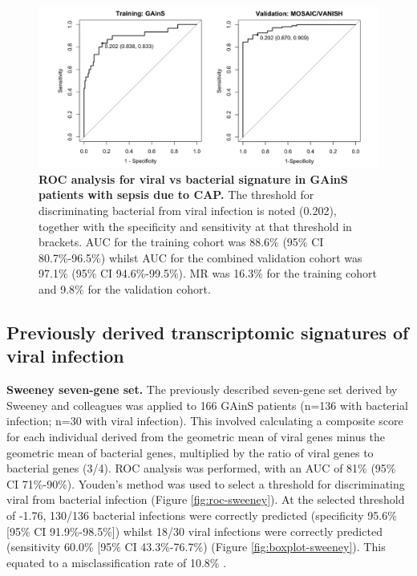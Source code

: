 \FloatBarrier
\begin{figure}[htbp]
\centering
\includegraphics[width=\textwidth]{./Results3/Images/bv-roc-combined.png}
\caption[ROC analysis for viral vs bacterial signature]{\textbf{ROC analysis for viral vs bacterial signature in GAinS patients with sepsis due to CAP.} The threshold for discriminating bacterial from viral infection is noted (0.202), together with the specificity and sensitivity at that threshold in brackets. AUC for the training cohort was 88.6\% (95\% CI 80.7\%-96.5\%) whilst AUC for the combined validation cohort was 97.1\% (95\% CI 94.6\%-99.5\%). MR was 16.3\% for the training cohort and 9.8\% for the validation cohort.}
\label{fig:roc-vb}
\end{figure}
\FloatBarrier

\subsection{Previously derived transcriptomic signatures of viral infection}
\textbf{Sweeney seven-gene set.} The previously described seven-gene set derived by Sweeney and colleagues \parencite{Sweeney2016} was applied to 166 GAinS patients (n=136 with bacterial infection; n=30 with viral infection). This involved calculating a composite score for each individual derived from the geometric mean of viral genes minus the geometric mean of bacterial genes, multiplied by the ratio of viral genes to bacterial genes (3/4). ROC analysis was performed, with an AUC of 81\% (95\% CI 71\%-90\%). Youden's method was used to select a threshold for discriminating viral from bacterial infection (Figure \ref{fig:roc-sweeney}). At the selected threshold of -1.76, 130/136 bacterial infections were correctly predicted (specificity 95.6\% [95\% CI 91.9\%-98.5\%]) whilst 18/30 viral infections were correctly predicted (sensitivity 60.0\% [95\% CI 43.3\%-76.7\%) (Figure \ref{fig:boxplot-sweeney}). This equated to a misclassification rate of 10.8\% .

